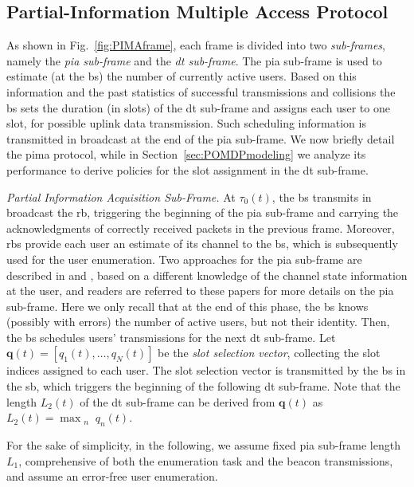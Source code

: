 \documentclass[conference]{IEEEtran}
\begin{document}
\subsection{Partial-Information Multiple Access Protocol}\label{sec:protocol}
As shown in Fig.~\ref{fig:PIMAframe}, each frame is divided into two {\em sub-frames}, namely the {\em \ac{pia} sub-frame} and the {\em \ac{dt} sub-frame}. The \ac{pia} sub-frame is used to estimate (at the \ac{bs}) the number of currently active users. Based on this information and the past statistics of successful transmissions and collisions the \ac{bs} sets the duration (in slots) of the \ac{dt} sub-frame and assigns each user to one slot, for possible uplink data transmission. Such scheduling information is transmitted in broadcast at the end of the \ac{pia} sub-frame. 
We now briefly detail the \ac{pima} protocol, while in Section~\ref{sec:POMDPmodeling} we analyze its performance to derive policies for the slot assignment in the \ac{dt} sub-frame.

\vspace{5pt}\noindent\emph{Partial Information Acquisition Sub-Frame.}
At $\tau_0(t)$, the \ac{bs} transmits in broadcast the \ac{rb}, triggering the beginning of the \ac{pia} sub-frame and carrying the acknowledgments of correctly received packets in the previous frame. 
Moreover, \acp{rb} provide each user an estimate of its channel to the \ac{bs}, which is subsequently used for the user enumeration. Two approaches for the \ac{pia} sub-frame are described in \cite{Rech2023Semi} and \cite{rech2023partial}, based on a different knowledge of the channel state information at the user, and readers are referred to these papers for more details on the \ac{pia} sub-frame. Here we only recall that at the end of this phase, the \ac{bs} knows (possibly with errors) the number of active users, but not their identity. Then, the \ac{bs} schedules users' transmissions for the next \ac{dt} sub-frame.
Let $\bm{q}(t) = [q_1(t), \ldots, q_N(t)]$ be the \textit{slot selection vector}, collecting the slot indices assigned to each user.
The slot selection vector is transmitted by the \ac{bs} in the \ac{sb}, which triggers the beginning of the following \ac{dt} sub-frame. Note that the length $L_2(t)$ of the \ac{dt} sub-frame can be derived from $\bm{q}(t)$ as $L_2(t) = \max_{\substack{n}} q_n(t)$.
 
For the sake of simplicity, in the following, we assume fixed \ac{pia} sub-frame length $L_1$, comprehensive of both the enumeration task and the beacon transmissions, and assume an error-free user enumeration.
\end{document}
